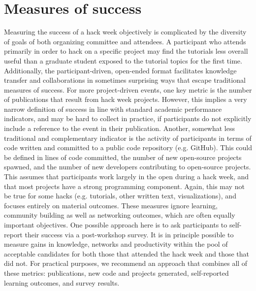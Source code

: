 \section*{Measures of success}

Measuring the success of a hack week objectively is complicated by the diversity of goals of both organizing committee and attendees.
A participant who attends primarily in order to hack on a specific project may find the tutorials less overall useful than a graduate student exposed to the tutorial topics for the first time.
Additionally, the participant-driven, open-ended format facilitates knowledge transfer and collaborations in sometimes surprising ways that escape traditional measures of success.
For more project-driven events, one key metric is the number of publications that result from hack week projects.
However, this implies a very narrow definition of success in line with standard academic performance indicators, and may be hard to collect in practice, if participants do not explicitly include a reference to the event in their publication.
Another, somewhat less traditional and complementary indicator is the activity of participants in terms of code written and committed to a public code repository (e.g. GitHub).
This could be defined in lines of code committed, the number of new open-source projects spawned, and the number of new developers contributing to open-source projects.
This assumes that participants work largely in the open during a hack week, and that most projects have a strong programming component.
Again, this may not be true for some hacks (e.g. tutorials, other written text, visualizations), and focuses entirely on material outcomes.
These measures ignore learning, community building as well as networking outcomes, which are often equally important objectives.
One possible approach here is to ask participants to self-report their success via a post-workshop survey.
It is in principle possible to measure gains in knowledge, networks and productivity within the pool of acceptable candidates for both those that attended the hack week and those that did not.
For practical purposes, we recommend an approach that combines all of these metrics: publications, new code and projects generated, self-reported learning outcomes, and survey results.

